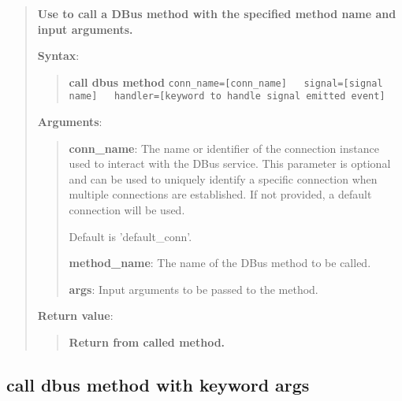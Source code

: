 \begin{quote}
\textbf{Use to call a DBus method with the specified method name and input arguments.}

\textbf{Syntax}:
\begin{quote}
\textbf{call dbus method}
\texttt{conn\_name={[}conn\_name{]}\ \ \ signal={[}signal name{]}\ \ \ handler={[}keyword to handle signal emitted event{]}}
\end{quote}

\textbf{Arguments}:

\begin{quote}
\textbf{conn\_name}: The name or identifier of the connection instance used to interact with the DBus service.
  This parameter is optional and can be used to uniquely identify a specific connection
  when multiple connections are established. If not provided, a default connection will be used.
  
  Default is 'default\_conn'.
  
\vspace{\baselineskip}

\textbf{method\_name}: The name of the DBus method to be called.

\vspace{\baselineskip}

\textbf{args}: Input arguments to be passed to the method.
\end{quote}

\textbf{Return value}:

\begin{quote}
\textbf{Return from called method.}
\end{quote}
\end{quote}



\hypertarget{description-call-dbus-method-with-keyword-args}{%
\subsection{\texorpdfstring{\textbf{call dbus method with keyword args}}{call dbus method with keyword args}}\label{description-call-dbus-method-with-keyword-args}}

